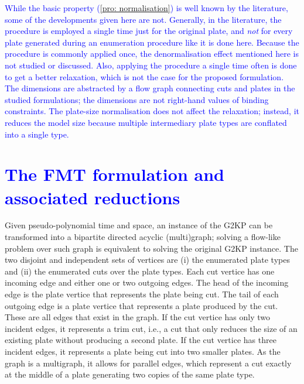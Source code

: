 \documentclass[ppgc,tese,english,formais,babel]{iiufrgs}
\newif\iffinalversion
\newcommand{\newtext}[1]{\iffinalversion%
#1%
\else%
\textcolor{blue}{#1}%
\fi%
}
\begin{document}
\newtext{
While the basic property (\cref{pro: normalisation}) is well known by the literature, some of the developments given here are not.
Generally, in the literature, the procedure is employed a single time just for the original plate, and \emph{not} for every plate generated during an enumeration procedure like it is done here.
Because the procedure is commonly applied once, the denormalisation effect mentioned here is not studied or discussed.
Also, applying the procedure a single time often is done to get a better relaxation, which is not the case for the proposed formulation.
The dimensions are abstracted by a flow graph connecting cuts and plates in the studied formulations; the dimensions are not right-hand values of binding constraints.
The plate-size normalisation does not affect the relaxation; instead, it reduces the model size because multiple intermediary plate types are conflated into a single type.
}


\section{\newtext{The FMT formulation and associated reductions}}
\label{sec:furini_model}

Given pseudo-polynomial time and space, an instance of the G2KP can be transformed into a bipartite directed acyclic (multi)graph; solving a flow-like problem over such graph is equivalent to solving the original G2KP instance.
The two disjoint and independent sets of vertices are (i) the enumerated plate types and (ii) the enumerated cuts over the plate types.
Each cut vertice has one incoming edge and either one or two outgoing edges.
The head of the incoming edge is the plate vertice that represents the plate being cut.
The tail of each outgoing edge is a plate vertice that represents a plate produced by the cut.
These are all edges that exist in the graph.
If the cut vertice has only two incident edges, it represents a trim cut, i.e., a cut that only reduces the size of an existing plate without producing a second plate.
If the cut vertice has three incident edges, it represents a plate being cut into two smaller plates.
As the graph is a multigraph, it allows for parallel edges, which represent a cut exactly at the middle of a plate generating two copies of the same plate type.
\end{document}
